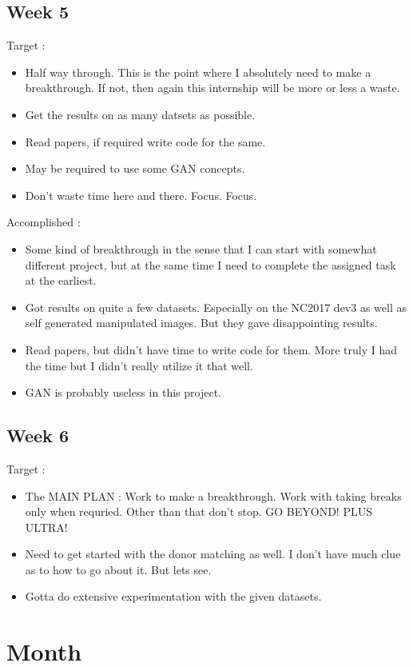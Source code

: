 \documentclass{article}
\begin{document}
\subsection{Week 5}
Target :
\begin{itemize}
\item Half way through. This is the point where I absolutely need to make a breakthrough. If not, then again this internship will be more or less a waste.
\item Get the results on as many datsets as possible.
\item Read papers, if required write code for the same.
\item May be required to use some GAN concepts.
\item Don't waste time here and there. Focus. Focus.
\end{itemize}

Accomplished :
\begin{itemize}
\item Some kind of breakthrough in the sense that I can start with somewhat different project, but at the same time I need to complete the assigned task at the earliest.
\item Got results on quite a few datasets. Especially on the NC2017 dev3 as well as self generated manipulated images. But they gave disappointing results.
\item Read papers, but didn't have time to write code for them. More truly I had the time but I didn't really utilize it that well.
\item GAN is probably useless in this project.
\end{itemize}

\subsection{Week 6}
Target :
\begin{itemize}
\item The MAIN PLAN : Work to make a breakthrough. Work with taking breaks only when requried. Other than that don't stop. GO BEYOND! PLUS ULTRA!
\item Need to get started with the donor matching as well. I don't have much clue as to how to go about it. But lets see.
\item Gotta do extensive experimentation with the given datasets.
\end{itemize}
\section{Month}
\end{document}
